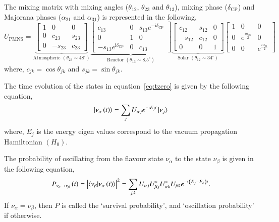 The mixing matrix with mixing angles ($\theta_{12}$, $\theta_{23}$ and
$\theta_{13}$), mixing phase ($\delta_{\mathrm{CP}}$) and Majorana phases
($\alpha_{21}$ and $\alpha_{31}$) is represented in the following,
\begin{equation}
  U_{\mathrm{PMNS}} =
  \underbrace{\begin{bmatrix}
      1 & 0 & 0 \\
      0 & c_{23} & s_{23} \\
      0 & -s_{23} & c_{23}
    \end{bmatrix}
  }_{\text{Atmospheric }\left(\theta_{23}\sim 48^{\circ}\right)}
  \underbrace{\begin{bmatrix}
      c_{13} & 0 & s_{13}e^{-\mathrm{i}\delta_{\mathrm{CP}}} \\
      0 & 1 & 0 \\
      -s_{13}e^{\mathrm{i}\delta_{\mathrm{CP}}} & 0 & c_{13}
    \end{bmatrix}
  }_{\text{Reactor }\left(\theta_{13}\sim 8.5^{\circ}\right)}
  \underbrace{\begin{bmatrix}
      c_{12} & s_{12} & 0 \\
      -s_{12} & c_{12} & 0 \\
      0 & 0 & 1
    \end{bmatrix}
  }_{\text{Solar }\left(\theta_{12}\sim 34^{\circ}\right)}
  \begin{bmatrix}
    1 & 0 & 0 \\
    0 & e^{\frac{i\alpha_{21}}{2}} & 0 \\
    0 & 0 & e^{\frac{i\alpha_{31}}{2}}
  \end{bmatrix}
  \label{eq:pmns}
\end{equation}
where, $c_{jk}=\cos\theta_{jk}$ and $s_{jk}=\sin\theta_{jk}$.

The time evolution of the states in equation~\ref{eq:tzero} is given
by the following equation,
\begin{equation}
  \ket{\nu_{\alpha}\left(t\right)}=\sum_{j}U_{\alpha j}e^{-\mathrm{i}E_{j}t}\ket{\nu_{j}} \label{eq:ttime}
\end{equation}
where, $E_{j}$ is the energy eigen values correspond to the vacuum
propagation Hamiltonian $\left(H_0\right)$.

The probability of oscillating from the flavour state $\nu_\alpha$ to
the state $\nu_\beta$ is given in the following equation,
\begin{equation}
  P_{\nu_\alpha\rightarrow\nu_\beta}\left(t\right) = \left|\braket{\nu_\beta|\nu_\alpha\left(t\right)}\right|^2 = \sum_{j,k}U_{\alpha j}U^{*}_{\beta j}U^{*}_{\alpha k}U_{\beta k}e^{-\mathrm{i}\left(E_{j}-E_{k}\right)t}.
  \label{eq:oscprob}
\end{equation}
If $\nu_\alpha=\nu_\beta$, then $P$ is called the `survival probability',
and `oscillation probability' if otherwise.

